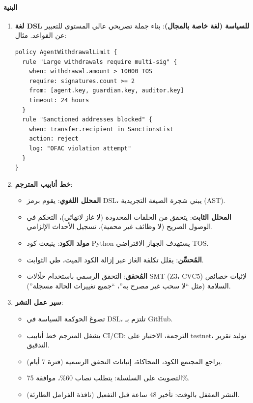 \documentclass[11pt]{article}
\begin{document}
\paragraph{البنية}
\begin{enumerate}[noitemsep]
  \item \textbf{لغة DSL للسياسة (لغة خاصة بالمجال)}: بناء جملة تصريحي عالي المستوى للتعبير عن القواعد. مثال:
  \begin{verbatim}
policy AgentWithdrawalLimit {
  rule "Large withdrawals require multi-sig" {
    when: withdrawal.amount > 10000 TOS
    require: signatures.count >= 2
    from: [agent.key, guardian.key, auditor.key]
    timeout: 24 hours
  }
  rule "Sanctioned addresses blocked" {
    when: transfer.recipient in SanctionsList
    action: reject
    log: "OFAC violation attempt"
  }
}
  \end{verbatim}
  \item \textbf{خط أنابيب المترجم}:
    \begin{itemize}[noitemsep]
      \item \textbf{المحلل اللغوي}: يقوم برمز DSL، يبني شجرة الصيغة التجريدية (AST).
      \item \textbf{المحلل الثابت}: يتحقق من الحلقات المحدودة (لا غاز لانهائي)، التحكم في الوصول الصريح (لا وظائف غير محمية)، تسجيل الأحداث الإلزامي.
      \item \textbf{مولد الكود}: ينبعث كود Python يستهدف الجهاز الافتراضي TOS.
      \item \textbf{المُحسِّن}: يقلل تكلفة الغاز عبر إزالة الكود الميت، طي الثوابت.
      \item \textbf{المُحقق}: التحقق الرسمي باستخدام حلّالات SMT (Z3، CVC5) لإثبات خصائص السلامة (مثل ``لا سحب غير مصرح به''، ``جميع تغييرات الحالة مسجلة'').
    \end{itemize}
  \item \textbf{سير عمل النشر}:
    \begin{itemize}[noitemsep]
      \item تصوغ الحوكمة السياسة في DSL، تلتزم بـ GitHub.
      \item يشغل المترجم خط أنابيب CI/CD: الترجمة، الاختبار على testnet، توليد تقرير التدقيق.
      \item يراجع المجتمع الكود، المحاكاة، إثباتات التحقق الرسمية (فترة 7 أيام).
      \item التصويت على السلسلة: يتطلب نصاب 60\%، موافقة 75\%.
      \item النشر المقفل بالوقت: تأخير 48 ساعة قبل التفعيل (نافذة الفرامل الطارئة).
    \end{itemize}
\end{enumerate}
\end{document}
